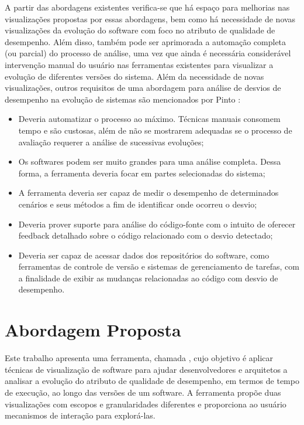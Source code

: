 A partir das abordagens existentes verifica-se que há espaço para melhorias nas visualizações propostas por essas abordagens, bem como há necessidade de novas visualizações da evolução do software com foco no atributo de qualidade de desempenho. Além disso, também pode ser aprimorada a automação completa (ou parcial) do processo de análise, uma vez que ainda é necessária considerável intervenção manual do usuário nas ferramentas existentes para visualizar a evolução de diferentes versões do sistema. Além da necessidade de novas visualizações, outros requisitos de uma abordagem para análise de desvios de desempenho na evolução de sistemas são mencionados por Pinto \cite{Pinto2015}:
\begin{itemize}
	\item Deveria automatizar o processo ao máximo. Técnicas manuais consomem tempo e são custosas, além de não se mostrarem adequadas se o processo de avaliação requerer a análise de sucessivas evoluções;
	\item Os softwares podem ser muito grandes para uma análise completa. Dessa forma, a ferramenta deveria focar em partes selecionadas do sistema;
	\item A ferramenta deveria ser capaz de medir o desempenho de determinados cenários e seus métodos a fim de identificar onde ocorreu o desvio;
	\item Deveria prover suporte para análise do código-fonte com o intuito de oferecer feedback detalhado sobre o código relacionado com o desvio detectado;
	\item Deveria ser capaz de acessar dados dos repositórios do software, como ferramentas de controle de versão e sistemas de gerenciamento de tarefas, com a finalidade de exibir as mudanças relacionadas ao código com desvio de desempenho.
\end{itemize}

\section{Abordagem Proposta} \label{sec:abordagem-proposta}

Este trabalho apresenta uma ferramenta, chamada \textit{\toolName}, cujo objetivo é aplicar técnicas de visualização de software para ajudar desenvolvedores e arquitetos a analisar a evolução do atributo de qualidade de desempenho, em termos de tempo de execução, ao longo das versões de um software. A ferramenta propõe duas visualizações com escopos e granularidades diferentes e proporciona ao usuário mecanismos de interação para explorá-las.

